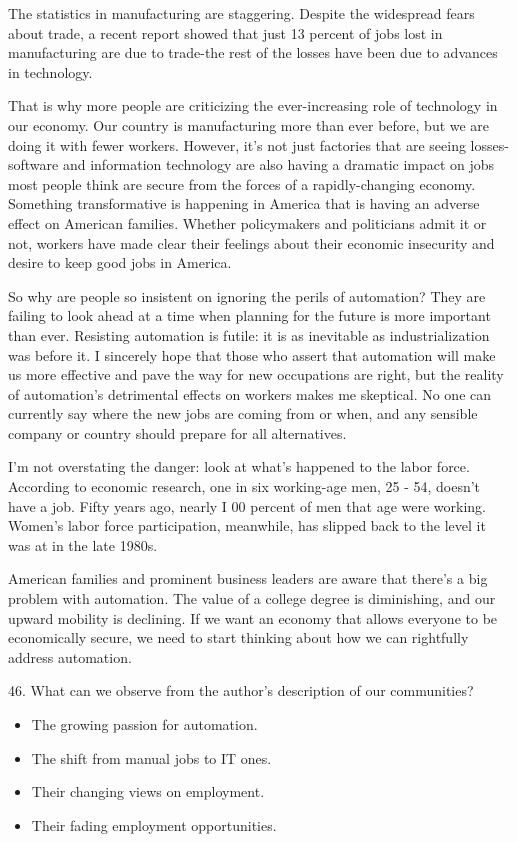 \documentclass[UTF8,11pt]{ctexart}
\begin{document}
The statistics in manufacturing are staggering. Despite the widespread fears about trade, a recent report showed that just 13 percent of jobs lost in manufacturing are due to trade-the rest of the losses have been due to advances in technology.


That is why more people are criticizing the ever-increasing role of technology in our economy. Our country is manufacturing more than ever before, but we are doing it with fewer workers. However, it's not just factories that are seeing losses- software and information technology are also having a dramatic impact on jobs most people think are secure from the forces of a rapidly-changing economy. Something transformative is happening in America that is having an adverse effect on American families. Whether policymakers and politicians admit it or not, workers have made clear their feelings about their economic insecurity and desire to keep good jobs in America.


So why are people so insistent on ignoring the perils of automation? They are failing to look ahead at a time when planning for the future is more important than ever. Resisting automation is futile: it is as inevitable as industrialization was before it. I sincerely hope that those who assert that automation will make us more effective and pave the way for new occupations are right, but the reality of automation's detrimental effects on workers makes me skeptical. No one can currently say where the new jobs are coming from or when, and any sensible company or country should prepare for all alternatives.


I'm not overstating the danger: look at what's happened to the labor force. According to economic research, one in six working-age men, 25 - 54, doesn't have a job. Fifty years ago, nearly I 00 percent of men that age were working. Women's labor force participation, meanwhile, has slipped back to the level it was at in the late 1980s.


American families and prominent business leaders are aware that there's a big problem with automation. The value of a college degree is diminishing, and our upward mobility is declining. If we want an economy that allows everyone to be economically secure, we need to start thinking about how we can rightfully address automation.


46. What can we observe from the author's description of our communities?


\begin{itemize}[leftmargin=2em,itemsep=.2em,topsep=.4em]\item[A.] The growing passion for automation.
\item[B.] The shift from manual jobs to IT ones.
\item[C.] Their changing views on employment.
\item[D.] Their fading employment opportunities.
\end{itemize}
\end{document}
